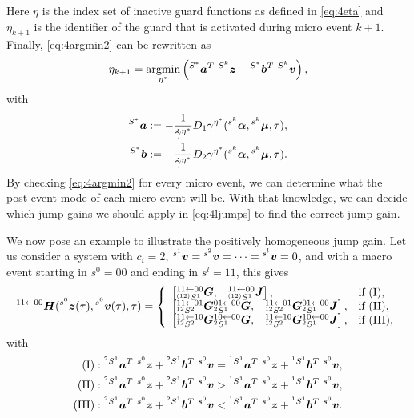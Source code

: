\documentclass[../DC2019003Bouma.tex]{subfiles}
\begin{document}
Here $\eta$ is the index set of inactive guard functions as defined in \eqref{eq:4eta} and $\eta_{k+1}$ is the identifier of the guard that is activated during micro event $k+1$. Finally, \eqref{eq:4argmin2} can be rewritten as
\begin{align}
\eta_{k+1} = \underset{\eta^*}{\argmin}\left(\ls^{S^\ast}\ab^T\ \ls^{S^k}\zb +\ls^{S^\ast}\bb^T\ \ls^{S^k}\vb\right),
\end{align}
with
\begin{align*}
\hspace{0cm}^{S^\ast}{\boldsymbol{a}} &:= -\frac{1}{\dot{\gamma}^{\eta^\ast}}D_1\gamma^{\eta^\ast}(\hspace{0cm}^{s^k}\boldsymbol{\alpha},\hspace{0cm}^{s^k}\boldsymbol{\mu},\tau),\\
\hspace{0cm}^{S^\ast}{\boldsymbol{b}} &:= -\frac{1}{\dot{\gamma}^{\eta^\ast}}D_2\gamma^{\eta^\ast}(\hspace{0cm}^{s^k}\boldsymbol{\alpha},\hspace{0cm}^{s^k}\boldsymbol{\mu},\tau).
\end{align*}
By checking \eqref{eq:4argmin2} for every micro event, we can determine what the post-event mode of each micro-event will be. With that knowledge, we can decide which jump gains we should apply in \eqref{eq:4ljumps} to find the correct jump gain.

We now pose an example to illustrate the positively homogeneous jump gain. Let us consider a system with $c_i = 2$, $\hspace{0cm}^{s^1}{\boldsymbol{v}}=\hspace{0cm}^{s^2}{\boldsymbol{v}}=\dots=\hspace{0cm}^{s^l}{\boldsymbol{v}}=0$, and with a macro event starting in $s^0 = 00$ and ending in $s^l = 11$, this gives 
\begin{align}
\hspace{0cm}^{11\leftarrow 00}{\boldsymbol{H}}(\hspace{0cm}^{s^0}{\boldsymbol{z}}(\tau),\hspace{0cm}^{s^0}{\boldsymbol{v}}(\tau),\tau) = \left\lbrace\begin{array}{ll}
\begin{bmatrix}\hspace{0cm}^{11\leftarrow 00}_{\hspace{0cm}^{(12)}S^1}{\boldsymbol{G}}, & \hspace{0cm}^{11\leftarrow 00}_{\hspace{0cm}^{(12)}S^1}{\boldsymbol{J}}\end{bmatrix}, & \text{if }(\text{I}),\\
\begin{bmatrix}\hspace{0cm}^{11\leftarrow 01}_{\hspace{0cm}^{12}S^2}{\boldsymbol{G}} \hspace{0cm}^{01\leftarrow 00}_{\hspace{0cm}^{2}S^1}{\boldsymbol{G}}, & \hspace{0cm}^{11\leftarrow 01}_{\hspace{0cm}^{12}S^2}{\boldsymbol{G}} \hspace{0cm}^{01\leftarrow 00}_{\hspace{0cm}^{2}S^1}{\boldsymbol{J}}\end{bmatrix}, & \text{if }(\text{II}),\\
\begin{bmatrix}\hspace{0cm}^{11\leftarrow 10}_{\hspace{0cm}^{12}S^2}{\boldsymbol{G}} \hspace{0cm}^{10\leftarrow 00}_{\hspace{0cm}^{2}S^1}{\boldsymbol{G}}, & \hspace{0cm}^{11\leftarrow 10}_{\hspace{0cm}^{12}S^2}{\boldsymbol{G}} \hspace{0cm}^{10\leftarrow 00}_{\hspace{0cm}^{2}S^1}{\boldsymbol{J}}\end{bmatrix}, & \text{if }(\text{III}),
\end{array}\right.\label{eq:4H2200}
\end{align}
with
\begin{align}
(\text{I})&:\ls^{^2 S^1}\ab^T\ \ls^{s^0}\zb +\ls^{^2 S^1}\bb^T\ \ls^{s^0}\vb = \ls^{^1 S^1}\ab^T\ \ls^{s^0}\zb +\ls^{^1 S^1}\bb^T\ \ls^{s^0}\vb,\nonumber\\
(\text{II})&:\ls^{^2 S^1}\ab^T\ \ls^{s^0}\zb +\ls^{^2 S^1}\bb^T\ \ls^{s^0}\vb > \ls^{^1 S^1}\ab^T\ \ls^{s^0}\zb +\ls^{^1 S^1}\bb^T\ \ls^{s^0}\vb,\label{eq:4conds}\\
(\text{III})&:\ls^{^2 S^1}\ab^T\ \ls^{s^0}\zb +\ls^{^2 S^1}\bb^T\ \ls^{s^0}\vb < \ls^{^1 S^1}\ab^T\ \ls^{s^0}\zb +\ls^{^1 S^1}\bb^T\ \ls^{s^0}\vb.\nonumber
\end{align}
\end{document}

